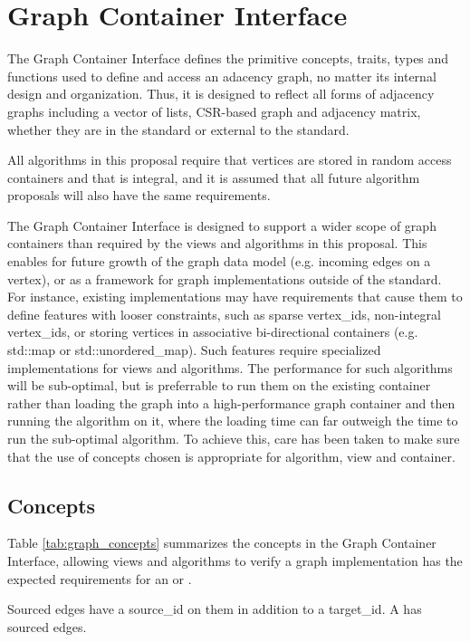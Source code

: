 
\chapter{Graph Container Interface}
The Graph Container Interface defines the primitive concepts, traits, types and functions used to define and access an adacency graph, no matter its internal design and organization. Thus, it is designed to reflect all forms of adjacency graphs including a vector of lists, CSR-based graph and adjacency matrix, whether they are in the standard or external to the standard.

All algorithms in this proposal require that vertices are stored in random access containers and that  is integral, and it is assumed that all future algorithm proposals will also have the same requirements. 

The Graph Container Interface is designed to support a wider scope of graph containers than required by the views and algorithms in this proposal. This enables for future growth of the graph data model (e.g. incoming edges on a vertex), or as a framework for graph implementations outside of the standard. For instance, existing implementations may have requirements that cause them to define features with looser constraints, such as sparse vertex\_ids, non-integral vertex\_ids, or storing vertices in associative bi-directional containers (e.g. std::map or std::unordered\_map). Such features require specialized implementations for views and algorithms. The performance for such algorithms will be sub-optimal, but is preferrable to run them on the existing container rather than loading the graph into a high-performance graph container and then running the algorithm on it, where the loading time can far outweigh the time to run the sub-optimal algorithm. To achieve this, care has been taken to make sure that the use of concepts chosen is appropriate for algorithm, view and container.

\section{Concepts}
Table \ref{tab:graph_concepts} summarizes the concepts in the Graph Container Interface, allowing views and algorithms to verify a graph implementation has the expected requirements for an  or .

Sourced edges have a source\_id on them in addition to a target\_id. A  has sourced edges.

